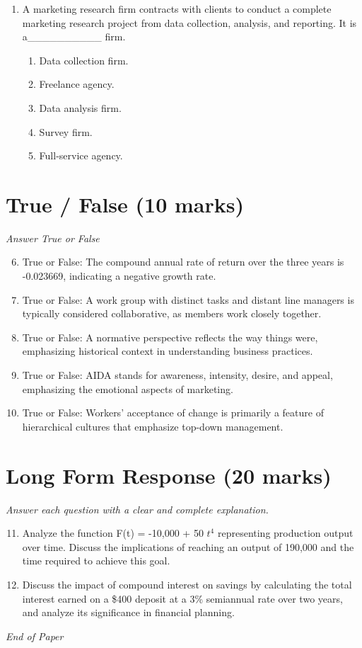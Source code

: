 \documentclass[12pt]{article}
\begin{document}
\begin{enumerate}[label=\arabic*.]
\begin{enumerate}[label=(\alph*)]
    \item Freight trains.
    \item Production factories.
    \item Haulage transport.
\end{enumerate}
\item A marketing research firm contracts with clients to conduct a complete marketing research project from data collection, analysis, and reporting. It is a\_\_\_\_\_\_\_\_\_\_ firm.
\begin{enumerate}[label=(\alph*)]
    \item Data collection firm.
    \item Freelance agency.
    \item Data analysis firm.
    \item Survey firm.
    \item Full-service agency.
\end{enumerate}
\end{enumerate}

\section*{True / False (10 marks)}
\textit{Answer True or False}
\begin{enumerate}[label=\arabic*.]
\setcounter{enumi}{5}
\item True or False: The compound annual rate of return over the three years is -0.023669, indicating a negative growth rate.
\item True or False: A work group with distinct tasks and distant line managers is typically considered collaborative, as members work closely together.
\item True or False: A normative perspective reflects the way things were, emphasizing historical context in understanding business practices.
\item True or False: AIDA stands for awareness, intensity, desire, and appeal, emphasizing the emotional aspects of marketing.
\item True or False: Workers' acceptance of change is primarily a feature of hierarchical cultures that emphasize top-down management.
\end{enumerate}

\section*{Long Form Response (20 marks)}
\textit{Answer each question with a clear and complete explanation.}
\begin{enumerate}[label=\arabic*.]
\setcounter{enumi}{10}
\item Analyze the function F(t) = -10,000 + 50 $t^4$ representing production output over time. Discuss the implications of reaching an output of 190,000 and the time required to achieve this goal.
\item Discuss the impact of compound interest on savings by calculating the total interest earned on a \$400 deposit at a 3\% semiannual rate over two years, and analyze its significance in financial planning.
\end{enumerate}

\vfill
\noindent\textit{End of Paper}
\end{document}
